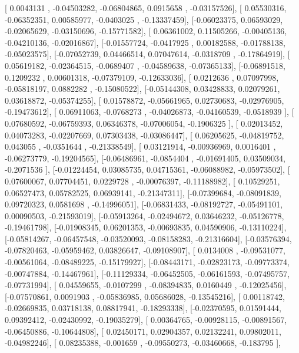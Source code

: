\documentclass{article}
\begin{document}
       [ 0.0043131 , -0.04503282, -0.06804865,  0.0915658 , -0.03157526],
       [ 0.05530316, -0.06352351,  0.00585977, -0.0403025 , -0.13337459],
       [-0.06023375,  0.06593029, -0.02065629, -0.03150696, -0.15771582],
       [ 0.06361002,  0.11505266, -0.00405136, -0.04210136, -0.02016867],
       [-0.01557724, -0.0417925 ,  0.00182588, -0.01788138, -0.05023575],
       [-0.07052739,  0.04466514,  0.07047614, -0.0318709 , -0.17864919],
       [ 0.05619182, -0.02364515, -0.0689407 , -0.04589638, -0.07365133],
       [-0.06891518,  0.1209232 ,  0.00601318, -0.07379109, -0.12633036],
       [ 0.0212636 ,  0.07097998, -0.05818197,  0.0882282 , -0.15080522],
       [-0.05144308,  0.03428833,  0.02079261,  0.03618872, -0.05374255],
       [ 0.01578872, -0.05661965,  0.02730683, -0.02976905, -0.19473612],
       [ 0.06911063, -0.0768273 , -0.04026873, -0.04160539, -0.0518939 ],
       [ 0.07680592, -0.06759393,  0.06346378, -0.07006054, -0.1906325 ],
       [ 0.02013452,  0.04073283, -0.02207669,  0.07303438, -0.03086447],
       [ 0.06205625, -0.04819752,  0.043055  , -0.0351644 , -0.21338549],
       [ 0.03121914, -0.00936969,  0.0016401 , -0.06273779, -0.19204565],
       [-0.06486961, -0.0854404 , -0.01691405,  0.03509034, -0.2071536 ],
       [-0.01224454,  0.03085735,  0.04715361, -0.06088982, -0.05973502],
       [ 0.07600067,  0.07704451,  0.0229728 , -0.00076397, -0.11188982],
       [ 0.10529251,  0.06527473,  0.05782525,  0.06939141, -0.21347311],
       [-0.07399684, -0.08091839,  0.09720323,  0.0581698 , -0.14996051],
       [-0.06831433, -0.08192727, -0.05491101,  0.00090503, -0.21593019],
       [-0.05913264, -0.02494672,  0.03646232, -0.05126778, -0.19461798],
       [-0.01908345,  0.06201353, -0.00693835,  0.04590906, -0.13110224],
       [-0.05814267, -0.06457548, -0.03520093, -0.08158283, -0.21316604],
       [-0.03576394, -0.07820463, -0.05959462,  0.03826647, -0.09108907],
       [ 0.0134008 , -0.09531077, -0.00561064, -0.08489225, -0.15179927],
       [-0.08443171, -0.02823173, -0.09773374, -0.00747884, -0.14467961],
       [-0.11129334, -0.06452505, -0.06161593, -0.07495757, -0.07731994],
       [ 0.04559655, -0.0107299 , -0.08394835,  0.0160449 , -0.12025456],
       [-0.07570861,  0.0091903 , -0.05836985,  0.05686028, -0.13545216],
       [ 0.00118742, -0.02669835,  0.03718138,  0.08817941, -0.18293338],
       [-0.02370595,  0.01591444,  0.09392412, -0.02430992, -0.19035279],
       [ 0.00364765, -0.00928115, -0.00891567, -0.06450886, -0.10644808],
       [ 0.02450171,  0.02904357,  0.02132241,  0.09802011, -0.04982246],
       [ 0.08235388, -0.001659  , -0.09550273, -0.03460668, -0.183795  ],
\end{document}
